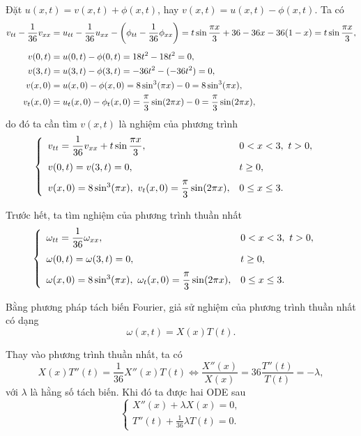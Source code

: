 \documentclass[10pt, a4paper]{article}
\begin{document}
	Đặt $u(x,t)=v(x,t)+\phi(x,t)$, hay $v(x,t)=u(x,t)-\phi(x,t)$. Ta có \begin{align*}
		v_{tt}-\frac{1}{36}v_{xx}&=u_{tt}-\frac{1}{36}u_{xx}-\left(\phi_{tt}-\frac{1}{36}\phi_{xx}\right)=t\sin\dfrac{\pi x}{3}+36-36x-36(1-x)=t\sin\dfrac{\pi x}{3},\\
		\noalign{\vskip5pt}
		v(0,t)&=u(0,t)-\phi(0,t)=18t^2-18t^2=0,\\
		v(3,t)&=u(3,t)-\phi(3,t)=-36t^2-(-36t^2)=0,\\
		v(x,0)&=u(x,0)-\phi(x,0)=8\sin^3(\pi x)-0=8\sin^3(\pi x),\\
		v_t(x,0)&=u_t(x,0)-\phi_t(x,0)=\dfrac\pi3\sin(2\pi x)-0=\dfrac\pi3\sin(2\pi x),
	\end{align*}
	do đó ta cần tìm $v(x,t)$ là nghiệm của phương trình $$\begin{cases}
		\begin{array}{ll}
			v_{tt}=\dfrac{1}{36}v_{xx}+t\sin\dfrac{\pi x}{3}, & 0<x<3,~t>0, \\
			\noalign{\vskip5pt}
			v(0,t)=v(3,t)=0, & t\ge0, \\
			\noalign{\vskip6pt}
			v(x,0)=8\sin^3(\pi x),~v_t(x,0)=\dfrac\pi3\sin(2\pi x), & 0\le x\le3.
		\end{array}
	\end{cases}$$
	
	Trước hết, ta tìm nghiệm của phương trình thuần nhất $$\begin{cases}
		\begin{array}{ll}
			\omega_{tt}=\dfrac{1}{36}\omega_{xx}, & 0<x<3,~t>0, \\
			\noalign{\vskip5pt}
			\omega(0,t)=\omega(3,t)=0, & t\ge0, \\
			\noalign{\vskip6pt}
			\omega(x,0)=8\sin^3(\pi x),~\omega_t(x,0)=\dfrac\pi3\sin(2\pi x), & 0\le x\le3.
		\end{array}
	\end{cases}$$
	
	Bằng phương pháp tách biến Fourier, giả sử nghiệm của phương trình thuần nhất có dạng $$\omega(x,t)=X(x)T(t).$$
	
	Thay vào phương trình thuần nhất, ta có $$X(x)T''(t)=\frac{1}{36}X''(x)T(t)\iff\frac{X''(x)}{X(x)}=36\frac{T''(t)}{T(t)}=-\lambda,$$
	với $\lambda$ là hằng số tách biến. Khi đó ta được hai ODE sau $$\begin{cases}
		X''(x)+\lambda X(x)=0,\\
		T''(t)+\frac{1}{36}\lambda T(t)=0.
	\end{cases}$$
	
\end{document}
